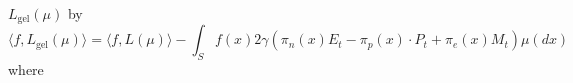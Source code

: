 $L_\text{gel}(\mu)$ by  \begin{equation}
    \langle f, L_\text{gel}(\mu)\rangle = \langle f, L(\mu)\rangle -\int_S f(x) 2\gamma\left(\pi_n(x)E_t-\pi_p(x)\cdot P_t + \pi_e(x)M_t\right) \mu(dx)
\end{equation} where